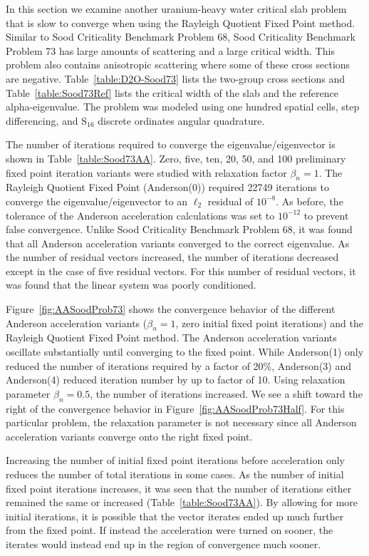 In this section we examine another uranium-heavy water critical slab problem that is slow to converge when using the Rayleigh Quotient Fixed Point method. Similar to Sood Criticality Benchmark Problem 68, Sood Criticality Benchmark Problem 73 has large amounts of scattering and a large critical width. This problem also contains anisotropic scattering where some of these cross sections are negative. Table~\ref{table:D2O-Sood73} lists the two-group cross sections and Table~\ref{table:Sood73Ref} lists the critical width of the slab and the reference alpha-eigenvalue. The problem was modeled using one hundred spatial cells, step differencing, and S$_{16}$ discrete ordinates angular quadrature.

The number of iterations required to converge the eigenvalue/eigenvector is shown in Table~\ref{table:Sood73AA}. Zero, five, ten, 20, 50, and 100 preliminary fixed point iteration variants were studied with relaxation factor $\beta_{n} = 1$. The Rayleigh Quotient Fixed Point (Anderson(0)) required 22749 iterations to converge the eigenvalue/eigenvector to an $\ell_{2}$ residual of $10^{-8}$. As before, the tolerance of the Anderson acceleration calculations was set to $10^{-12}$ to prevent false convergence. Unlike Sood Criticality Benchmark Problem 68, it was found that all Anderson acceleration variants converged to the correct eigenvalue. As the number of residual vectors increased, the number of iterations decreased except in the case of five residual vectors. For this number of residual vectors, it was found that the linear system was poorly conditioned.

Figure~\ref{fig:AASoodProb73} shows the convergence behavior of the different Anderson acceleration variants ($\beta_{n} = 1$, zero initial fixed point iterations) and the Rayleigh Quotient Fixed Point method. The Anderson acceleration variants oscillate substantially until converging to the fixed point. While Anderson(1) only reduced the number of iterations required by a factor of 20\%, Anderson(3) and Anderson(4) reduced iteration number by up to factor of 10. Using relaxation parameter $\beta_{n} = 0.5$, the number of iterations increased. We see a shift toward the right of the convergence behavior in Figure~\ref{fig:AASoodProb73Half}. For this particular problem, the relaxation parameter is not necessary since all Anderson acceleration variants converge onto the right fixed point.

Increasing the number of initial fixed point iterations before acceleration only reduces the number of total iterations in some cases. As the number of initial fixed point iterations increases, it was seen that the number of iterations either remained the same or increased (Table~\ref{table:Sood73AA}). By allowing for more initial iterations, it is possible that the vector iterates ended up much further from the fixed point. If instead the acceleration were turned on sooner, the iterates would instead end up in the region of convergence much sooner.

